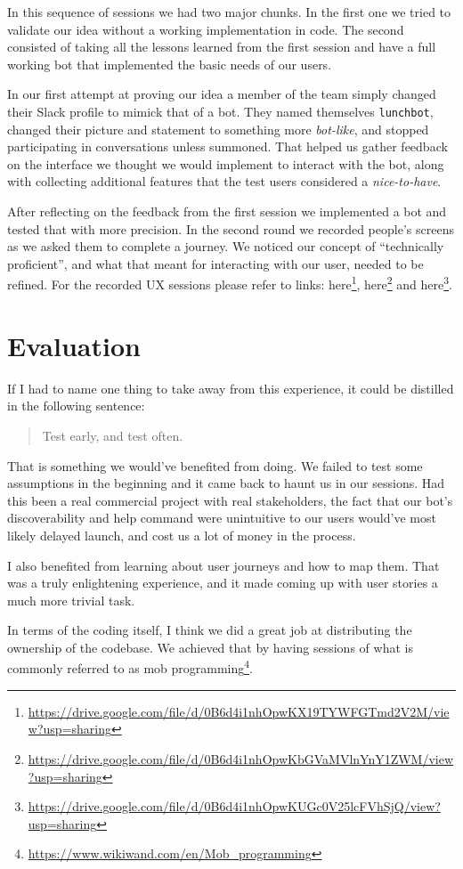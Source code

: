 \documentclass[english,a4paper,]{report}
\renewcommand{\href}[2]{#2\footnote{\url{#1}}}
\begin{document}
In this sequence of sessions we had two major chunks. In the first one
we tried to validate our idea without a working implementation in code.
The second consisted of taking all the lessons learned from the first
session and have a full working bot that implemented the basic needs of
our users.

In our first attempt at proving our idea a member of the team simply
changed their Slack profile to mimick that of a bot. They named
themselves \texttt{lunchbot}, changed their picture and statement to
something more \emph{bot-like}, and stopped participating in
conversations unless summoned. That helped us gather feedback on the
interface we thought we would implement to interact with the bot, along
with collecting additional features that the test users considered a
\emph{nice-to-have}.

After reflecting on the feedback from the first session we implemented a
bot and tested that with more precision. In the second round we recorded
people's screens as we asked them to complete a journey. We noticed our
concept of ``technically proficient'', and what that meant for
interacting with our user, needed to be refined. For the recorded UX
sessions please refer to links:
\href{https://drive.google.com/file/d/0B6d4i1nhOpwKX19TYWFGTmd2V2M/view?usp=sharing}{here},
\href{https://drive.google.com/file/d/0B6d4i1nhOpwKbGVaMVlnYnY1ZWM/view?usp=sharing}{here}
and
\href{https://drive.google.com/file/d/0B6d4i1nhOpwKUGc0V25lcFVhSjQ/view?usp=sharing}{here}.

\chapter{Evaluation}\label{evaluation}

If I had to name one thing to take away from this experience, it could
be distilled in the following sentence:

\begin{quote}
Test early, and test often.
\end{quote}

That is something we would've benefited from doing. We failed to test
some assumptions in the beginning and it came back to haunt us in our
sessions. Had this been a real commercial project with real
stakeholders, the fact that our bot's discoverability and help command
were unintuitive to our users would've most likely delayed launch, and
cost us a lot of money in the process.

I also benefited from learning about user journeys and how to map them.
That was a truly enlightening experience, and it made coming up with
user stories a much more trivial task.

In terms of the coding itself, I think we did a great job at
distributing the ownership of the codebase. We achieved that by having
sessions of what is commonly referred to as
\href{https://www.wikiwand.com/en/Mob_programming}{mob programming}.
\end{document}
